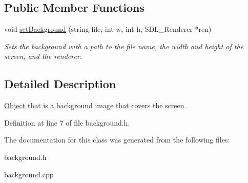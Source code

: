 \subsection*{Public Member Functions}
\begin{DoxyCompactItemize}
\item 
void \hyperlink{classBackground_ae0b55ad792ad37c5d7c200c47ff09859}{set\+Background} (string file, int w, int h, S\+D\+L\+\_\+\+Renderer $\ast$ren)\hypertarget{classBackground_ae0b55ad792ad37c5d7c200c47ff09859}{}\label{classBackground_ae0b55ad792ad37c5d7c200c47ff09859}

\begin{DoxyCompactList}\small\item\em Sets the background with a path to the file name, the width and height of the screen, and the renderer. \end{DoxyCompactList}\end{DoxyCompactItemize}


\subsection{Detailed Description}
\hyperlink{classObject}{Object} that is a background image that covers the screen. 

Definition at line 7 of file background.\+h.



The documentation for this class was generated from the following files\+:\begin{DoxyCompactItemize}
\item 
background.\+h\item 
background.\+cpp\end{DoxyCompactItemize}

